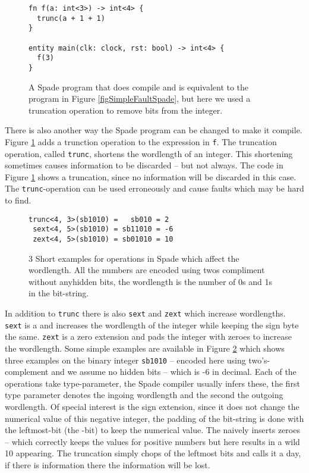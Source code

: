 \begin{figure}[h!]
\centering
  \begin{verbatim}
fn f(a: int<3>) -> int<4> {
  trunc(a + 1 + 1)
}

entity main(clk: clock, rst: bool) -> int<4> {
  f(3)
}
\end{verbatim}
  \caption{ A Spade program that does compile and is equivalent to the program in Figure \ref{figSimpleFaultSpade}, but here we used a truncation operation to remove bits from the integer.}
\label{figSimpleTruncSpade}
\end{figure}

There is also another way the Spade program can be changed to make it compile. Figure \ref{figSimpleTruncSpade} adds a trunction operation to the expression in \verb+f+. The truncation operation, called \verb+trunc+, shortens the wordlength of an integer. This shortening sometimes causes information to be discarded -- but not always. The code in Figure \ref{figSimpleTruncSpade} shows a  truncation, since no information will be discarded in this case. The \verb+trunc+-operation can be used erroneously and cause faults which may be hard to find.

\begin{figure}[h!]
\centering
\begin{verbatim}
trunc<4, 3>(sb1010) =   sb010 = 2
 sext<4, 5>(sb1010) = sb11010 = -6
 zext<4, 5>(sb1010) = sb01010 = 10
\end{verbatim}
  \caption{3 Short examples for operations in Spade which affect the wordlength. All the numbers are encoded using twos compliment without anyhidden bits, the wordlength is the number of 0s and 1s in the bit-string.}
\label{figSext}
\end{figure}

In addition to \verb+trunc+ there is also \verb+sext+ and \verb+zext+ which increase wordlengths. \verb+sext+ is a  and increases the wordlength of the integer while keeping the sign byte the same. \verb+zext+ is a zero extension and pads the integer with zeroes to increase the wordlength. Some simple examples are available in Figure \ref{figSext} which shows three examples on the binary integer \verb+sb1010+ -- encoded here using two's-complement and we assume no hidden bits --  which is -6 in decimal. Each of the operations take type-parameter, the Spade compiler usually infers these, the first type parameter denotes the ingoing wordlength and the second the outgoing wordlength. Of special interest is the sign extension, since it does not change the numerical value of this negative integer, the padding of the bit-string is done with the leftmost-bit (the -bit) to keep the numerical value. The  naively inserts zeroes -- which correctly keeps the values for positive numbers but here results in a wild 10 appearing. The truncation simply chops of the leftmost bits and calls it a day, if there is information there the information will be lost.

